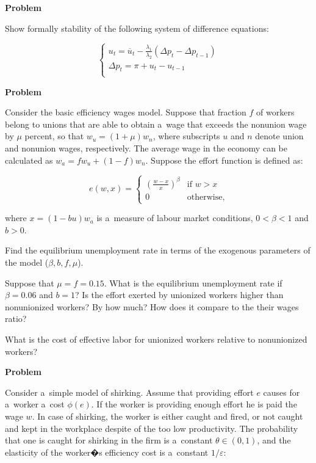 \documentclass[a4paper, notitlepage, 11pt]{article}
\newcounter{zadlicz}[section]%
\newcommand{\tytul}[2]{\setcounter{equation}{0}\addtocounter{zadlicz}{1}\vspace{\abovedisplayskip}\noindent\textbf{#1\ \thezadlicz #2}}%
\begin{document}
\tytul{Problem}{}

\noindent%
Show formally stability of the following system of difference equations:

\[
\left\{%
\begin{array}{l}
    u_t = \overline{u}_t-\frac{\lambda_1}{\lambda_2}(\Delta p_t-\Delta p_{t-1}) \\
    \Delta p_t = \pi + u_t - u_{t-1} \\
\end{array}%
\right.
\]


\tytul{Problem}{}

\noindent%
Consider the basic efficiency wages model. Suppose that fraction $f$ of workers belong to unions that are able to obtain a~wage that exceeds the nonunion wage by $\mu$ percent, so that $w_u=(1+\mu)w_n$, where subscripts $u$ and $n$ denote union and nonunion wages, respectively. The average wage in the economy can be calculated as $w_a=fw_u+(1-f)w_n$. Suppose the effort function is defined as:

\[
e(w,x)=\label{example_9.12}
\begin{cases}
 \left(\frac{w-x}{x}\right)^\beta & \text{if } w>x \\
 0                                & \text{otherwise},
\end{cases}
\]

where  $x = (1-bu)w_a$ is a~measure of labour market conditions, $0<\beta<1$ and $b>0$.

\begin{wylicz}
\item Find the equilibrium unemployment rate in terms of the exogenous parameters of the model ($\beta,b,f,\mu$).
\item Suppose that $\mu=f=0.15$. What is the equilibrium unemployment rate if $\beta=0.06$ and $b=1$? Is the effort exerted by unionized workers higher than nonunionized workers? By how much? How does it compare to the their wages ratio?
\item What is the cost of effective labor for unionized workers relative to nonunionized workers?
\end{wylicz}

\tytul{Problem}{}

\noindent%
Consider a~simple model of shirking. Assume that providing effort $e$ causes for a~worker a~cost $\phi(e)$. If the worker is providing enough effort he is paid the wage $w$. In case of shirking, the worker is either caught and fired, or not caught and kept in the workplace despite of the too low productivity. The probability that one is caught for shirking in the firm is a~constant $\theta\in (0, 1)$, and the elasticity of the worker�s efficiency cost is a~constant $1/\varepsilon$:
\end{document}

